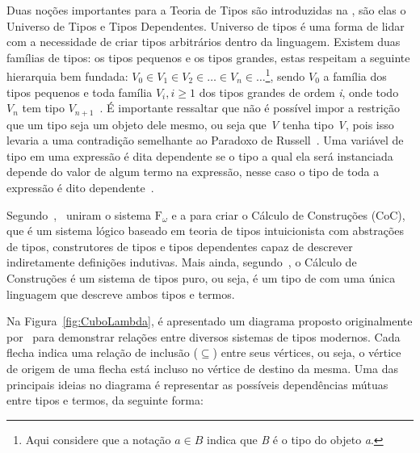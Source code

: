		Duas noções importantes para a Teoria de Tipos são introduzidas na \TTML, são elas o Universo de Tipos e Tipos Dependentes. Universo de tipos é uma forma de lidar
		com a necessidade de criar tipos arbitrários dentro da linguagem. Existem duas famílias de tipos: os tipos pequenos e os tipos grandes, estas respeitam
		a seguinte hierarquia bem fundada: \(V_0 \in V_1 \in V_2 \in \dots \in V_n \in \dots\)\footnote{Aqui considere que a notação \(a \in B\) indica que \textit{B}
		é o tipo do objeto \textit{a}.}, sendo \(V_0\) a família dos tipos pequenos e toda família \(V_i, i \geq 1\) dos tipos grandes
		de ordem \textit{i}, onde todo \(V_n\) tem tipo \(V_{n+1}\)~\cite{martin1975intuitionistic}. É importante ressaltar que não é possível impor a restrição
		que um tipo seja um objeto dele mesmo, ou seja que \textit{V} tenha tipo \textit{V}, pois isso levaria a uma contradição semelhante ao Paradoxo de Russell~\cite{girard1972interpretation}.
		Uma variável de tipo em uma expressão é dita dependente se o tipo a qual ela será instanciada depende do valor de algum termo na expressão, nesse
		caso o tipo de toda a expressão é dito dependente~\cite{martin1975intuitionistic}.

		Segundo~,~ uniram o sistema \(\mathrm{F}_\omega\) e a \TTML para criar o Cálculo de Construções (CoC),
		que é um sistema lógico baseado em teoria de tipos intuicionista com abstrações de tipos, construtores de tipos e tipos dependentes capaz de
		descrever indiretamente definições indutivas. Mais ainda, segundo~, o Cálculo de Construções é um sistema de tipos
		puro, ou seja, é um tipo de \CalcLambda com uma única linguagem que descreve ambos tipos e termos.

		Na Figura~\ref{fig:CuboLambda}, é apresentado um diagrama proposto originalmente por~ para demonstrar relações entre
		diversos sistemas de tipos modernos. Cada flecha indica uma relação de inclusão (\(\subseteq\)) entre seus vértices, ou seja, o vértice de origem de uma flecha está incluso
		no vértice de destino da mesma. Uma das principais ideias no diagrama é representar as possíveis dependências mútuas entre tipos e termos, da seguinte forma:

